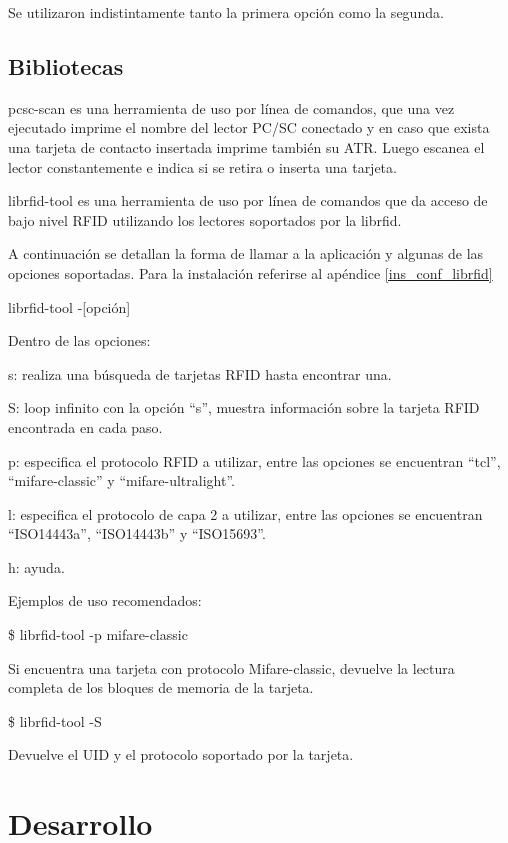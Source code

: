 \bigskip
Se utilizaron indistintamente tanto la primera opción como la segunda.

\subsection{Bibliotecas}
pcsc-scan es una herramienta de uso por línea de comandos, que una vez ejecutado imprime el nombre del lector PC/SC conectado y en caso que exista una tarjeta de contacto insertada imprime también su ATR. Luego  escanea el lector constantemente e indica si se retira o inserta una tarjeta.

\bigskip
librfid-tool es una herramienta de uso por línea de comandos que da acceso de bajo nivel RFID utilizando los lectores soportados por la librfid.

\bigskip
A continuación se detallan la forma de llamar a la aplicación y algunas de las opciones soportadas. Para la instalación referirse al apéndice \ref{ins_conf_librfid}

\bigskip
librfid-tool -[opción]

\bigskip
Dentro de las opciones:

s: realiza una búsqueda de tarjetas RFID hasta encontrar una.

S: loop infinito con la opción “s”, muestra información sobre la tarjeta RFID encontrada en cada paso.

p: especifica el protocolo RFID a utilizar, entre las opciones se encuentran “tcl”, “mifare-classic” y  “mifare-ultralight”.

l: especifica el protocolo de capa 2 a utilizar, entre las opciones se encuentran “ISO14443a”, “ISO14443b” y “ISO15693”.

h: ayuda.

\bigskip
Ejemplos de uso recomendados:

\bigskip
\centerline{\$ librfid-tool -p mifare-classic}

Si encuentra una tarjeta con protocolo Mifare-classic, devuelve la lectura completa de los bloques de memoria de la tarjeta.

\bigskip
\centerline{\$ librfid-tool -S}

Devuelve el UID y el protocolo soportado por la tarjeta.

\section{Desarrollo}

